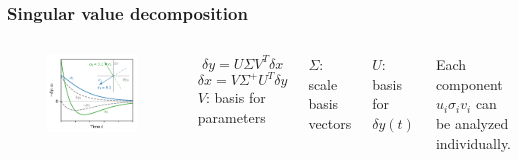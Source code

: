 \documentclass[xcolor={dvipsnames}]{beamer}
\begin{document}
\begin{frame}
\frametitle{Singular value decomposition}
\begin{columns}
\hspace{-0.35in}
\vspace{-0.36in}
\begin{figure}
\includegraphics[height=0.86\textheight]{figs/dy-usv.pdf}
\end{figure}
$$\delta y = U \Sigma V^T \delta x$$
$$\delta x = V \Sigma^{+} U^T \delta y$$
$V$: basis for parameters

$\Sigma$: scale basis vectors

$U$: basis for $\delta y(t)$

\vspace{0.2in}

Each component $u_i \sigma_i v_i$ can be analyzed individually.
\end{columns}
\end{frame}
\end{document}
